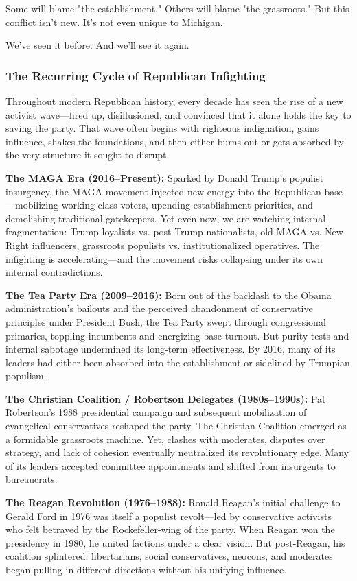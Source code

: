 Some will blame "the establishment." Others will blame "the grassroots." But this conflict isn’t new. It’s not even unique to Michigan.

We’ve seen it before. And we’ll see it again.

\subsubsection{The Recurring Cycle of Republican Infighting}
Throughout modern Republican history, every decade has seen the rise of a new activist wave—fired up, disillusioned, and convinced that it alone holds the key to saving the party. That wave often begins with righteous indignation, gains influence, shakes the foundations, and then either burns out or gets absorbed by the very structure it sought to disrupt.

\textbf{The MAGA Era (2016–Present):} Sparked by Donald Trump’s populist insurgency, the MAGA movement injected new energy into the Republican base—mobilizing working-class voters, upending establishment priorities, and demolishing traditional gatekeepers. Yet even now, we are watching internal fragmentation: Trump loyalists vs. post-Trump nationalists, old MAGA vs. New Right influencers, grassroots populists vs. institutionalized operatives. The infighting is accelerating—and the movement risks collapsing under its own internal contradictions.

\textbf{The Tea Party Era (2009–2016):} Born out of the backlash to the Obama administration’s bailouts and the perceived abandonment of conservative principles under President Bush, the Tea Party swept through congressional primaries, toppling incumbents and energizing base turnout. But purity tests and internal sabotage undermined its long-term effectiveness. By 2016, many of its leaders had either been absorbed into the establishment or sidelined by Trumpian populism.

\textbf{The Christian Coalition / Robertson Delegates (1980s–1990s):} Pat Robertson’s 1988 presidential campaign and subsequent mobilization of evangelical conservatives reshaped the party. The Christian Coalition emerged as a formidable grassroots machine. Yet, clashes with moderates, disputes over strategy, and lack of cohesion eventually neutralized its revolutionary edge. Many of its leaders accepted committee appointments and shifted from insurgents to bureaucrats.

\textbf{The Reagan Revolution (1976–1988):} Ronald Reagan’s initial challenge to Gerald Ford in 1976 was itself a populist revolt—led by conservative activists who felt betrayed by the Rockefeller-wing of the party. When Reagan won the presidency in 1980, he united factions under a clear vision. But post-Reagan, his coalition splintered: libertarians, social conservatives, neocons, and moderates began pulling in different directions without his unifying influence.

